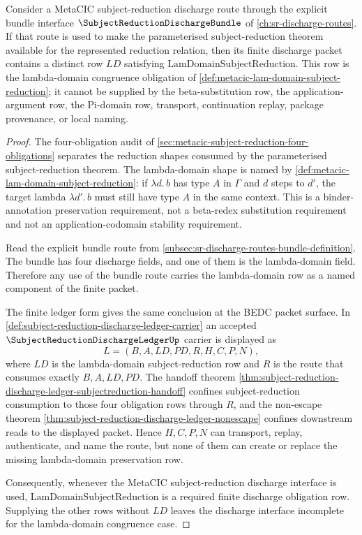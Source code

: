 \begin{proposition}\label{prop:metacic-lam-domain-setup-row-mandatory}
Consider a MetaCIC subject-reduction discharge route through the explicit bundle interface $\SubjectReductionDischargeBundle$ of \autoref{ch:sr-discharge-routes}. If that route is used to make the parameterised subject-reduction theorem available for the represented reduction relation, then its finite discharge packet contains a distinct row $LD$ satisfying $\mathrm{LamDomainSubjectReduction}$. This row is the lambda-domain congruence obligation of \autoref{def:metacic-lam-domain-subject-reduction}; it cannot be supplied by the beta-substitution row, the application-argument row, the Pi-domain row, transport, continuation replay, package provenance, or local naming.
\end{proposition}
\begin{proof}
The four-obligation audit of \autoref{sec:metacic-subject-reduction-four-obligations} separates the reduction shapes consumed by the parameterised subject-reduction theorem. The lambda-domain shape is named by \autoref{def:metacic-lam-domain-subject-reduction}: if $\lambda d.\,b$ has type $A$ in $\Gamma$ and $d$ steps to $d'$, the target lambda $\lambda d'.\,b$ must still have type $A$ in the same context. This is a binder-annotation preservation requirement, not a beta-redex substitution requirement and not an application-codomain stability requirement.

Read the explicit bundle route from \autoref{subsec:sr-discharge-routes-bundle-definition}. The bundle has four discharge fields, and one of them is the lambda-domain field. Therefore any use of the bundle route carries the lambda-domain row as a named component of the finite packet.

The finite ledger form gives the same conclusion at the BEDC packet surface. In \autoref{def:subject-reduction-discharge-ledger-carrier} an accepted $\SubjectReductionDischargeLedgerUp$ carrier is displayed as
$$
L=(B,A,LD,PD,R,H,C,P,N),
$$
where $LD$ is the lambda-domain subject-reduction row and $R$ is the route that consumes exactly $B,A,LD,PD$. The handoff theorem \autoref{thm:subject-reduction-discharge-ledger-subjectreduction-handoff} confines subject-reduction consumption to those four obligation rows through $R$, and the non-escape theorem \autoref{thm:subject-reduction-discharge-ledger-nonescape} confines downstream reads to the displayed packet. Hence $H,C,P,N$ can transport, replay, authenticate, and name the route, but none of them can create or replace the missing lambda-domain preservation row.

Consequently, whenever the MetaCIC subject-reduction discharge interface is used, $\mathrm{LamDomainSubjectReduction}$ is a required finite discharge obligation row. Supplying the other rows without $LD$ leaves the discharge interface incomplete for the lambda-domain congruence case.
\end{proof}

